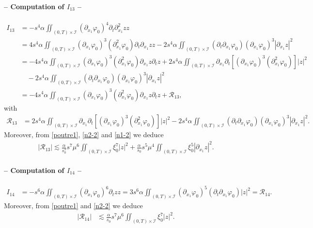 \documentclass[a4paper, 12pt]{article}
\theoremstyle{plain}
\theoremstyle{definition}
\numberwithin{theorem}{section}
\numberwithin{equation}{section}
\begin{document}
{\paragraph{-- Computation of $I_{13}$ --}
\begin{align*}
I_{13}&=-s^4\alpha \iint_{(0,T)\times\mathcal{I}}(\partial_{x_1}\varphi_0)^4\partial_t\partial_{x_1}^2zz\\
&=4s^4\alpha \iint_{(0,T)\times\mathcal{I}}(\partial_{x_1}\varphi_0)^3(\partial^2_{x_1}\varphi_0)\partial_t\partial_{x_1}zz-2s^4\alpha\iint_{(0,T)\times\mathcal{I}}(\partial_t\partial_{x_1}\varphi_0)(\partial_{x_1}\varphi_0)^3|\partial_{x_1}z|^2\\
&=-4s^4\alpha\iint_{(0,T)\times\mathcal{I}}(\partial_{x_1}\varphi_0)^3(\partial^2_{x_1}\varphi_0)\partial_{x_1}z\partial_tz+2s^4\alpha \iint_{(0,T)\times\mathcal{I}}\partial_{x_1}\partial_t[(\partial_{x_1}\varphi_0)^3(\partial^2_{x_1}\varphi_0)]|z|^2\\
&\quad -2s^4\alpha\iint_{(0,T)\times\mathcal{I}}(\partial_t\partial_{x_1}\varphi_0)(\partial_{x_1}\varphi_0)^3|\partial_{x_1}z|^2\\
&=-4s^4\alpha\iint_{(0,T)\times\mathcal{I}}(\partial_{x_1}\varphi_0)^3(\partial^2_{x_1}\varphi_0)\partial_{x_1}z\partial_tz+\mathcal{R}_{13},
\end{align*}
with
\begin{align*}
\mathcal{R}_{13}&=2s^4\alpha \iint_{(0,T)\times\mathcal{I}}\partial_{x_1}\partial_t[(\partial_{x_1}\varphi_0)^3(\partial^2_{x_1}\varphi_0)]|z|^2-2s^4\alpha\iint_{(0,T)\times\mathcal{I}}(\partial_t\partial_{x_1}\varphi_0)(\partial_{x_1}\varphi_0)^3|\partial_{x_1}z|^2.
\end{align*}
Moreover, from \eqref{poutre1}, \eqref{n2-2} and \eqref{n1-2} we deduce
\begin{align}
|\mathcal{R}_{13}|\lesssim \frac{\alpha}{s_0^3}s^7\mu^6\iint_{(0,T)\times\mathcal{I}}\xi_0^7|z|^2+\frac{\alpha}{s_0} s^5\mu^4\iint_{(0,T)\times\mathcal{I}}\xi_0^5|\partial_{x_1}z|^2.\label{EstR13}
\end{align}
\paragraph{-- Computation of $I_{14}$ --}
\begin{align*}
I_{14}&=-s^6\alpha\iint_{(0,T)\times\mathcal{I}}(\partial_{x_1}\varphi_0)^6\partial_tzz
=3s^6\alpha\iint_{(0,T)\times\mathcal{I}}(\partial_{x_1}\varphi_0)^5(\partial_t\partial_{x_1}\varphi_0)|z|^2=\mathcal{R}_{14}.
\end{align*}
Moreover, from \eqref{poutre1} and \eqref{n2-2} we deduce
\begin{align}\label{EstI14}
|\mathcal{R}_{14}|&\lesssim \frac{\alpha}{s_0}s^7\mu^6 \iint_{(0,T)\times\mathcal{I}}\xi_0^7|z|^2.
\end{align}
}
\end{document}
